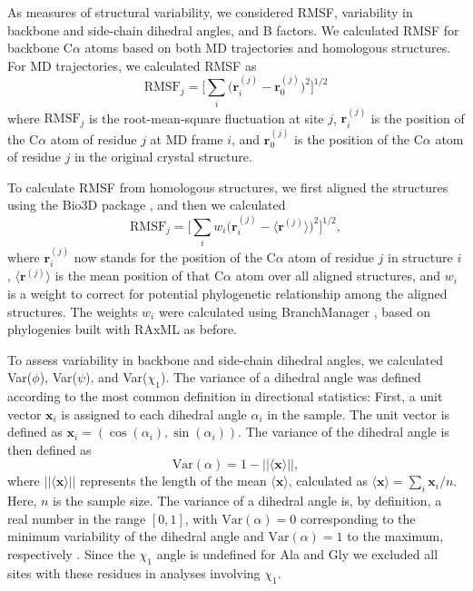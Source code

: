 \documentclass[smallextended]{svjour3}
\begin{document}
As measures of structural variability, we considered RMSF, variability in backbone and side-chain dihedral angles, and B factors. We calculated RMSF for backbone C$\alpha$ atoms based on both MD trajectories and homologous structures. For MD trajectories, we calculated RMSF as
\begin{equation}
    \text{RMSF}_j = \Big[\sum_i \big(\mathbf{r}_i^{(j)}-\mathbf{r}_0^{(j)}\big)^2\Big]^{1/2}
\end{equation}
where $\text{RMSF}_j$ is the root-mean-square fluctuation at site $j$, $\mathbf{r}_i^{(j)}$ is the position of the C$\alpha$ atom of residue $j$ at MD frame $i$, and $\mathbf{r}_0^{(j)}$ is the position of the C$\alpha$ atom of residue $j$ in the original crystal structure.

To calculate RMSF from homologous structures, we first aligned the structures using the Bio3D package \citep{Grantetal2006}, and then we calculated
\begin{equation}
    \text{RMSF}_j = \Big[\sum_i w_i\big(\mathbf{r}_i^{(j)}-\langle\mathbf{r}^{(j)}\rangle\big)^2\Big]^{1/2},
\end{equation}
where $\mathbf{r}_i^{(j)}$ now stands for the position of the C$\alpha$ atom of residue $j$ in structure $i$, $\langle\mathbf{r}^{(j)}\rangle$ is the mean position of that C$\alpha$ atom over all aligned structures, and $w_i$ is a weight to correct for potential phylogenetic relationship among the aligned structures. The weights $w_i$ were calculated using BranchManager \citep{StoneSidow2007}, based on phylogenies built with RAxML as before.

To assess variability in backbone and side-chain dihedral angles, we calculated Var($\phi$), Var($\psi$), and Var($\chi_1$). The variance of a dihedral angle was defined according to the most common definition in directional statistics:  
First, a unit vector $\mathbf{x}_i$ is assigned to each dihedral angle $\alpha_i$ in the sample. The unit vector is defined as $\mathbf{x}_i = ( \cos (\alpha_i), \sin (\alpha_i) )$.
The variance of the dihedral angle is then defined as
\begin{equation}
\text{Var}(\alpha) = 1 - ||\langle \mathbf{x}\rangle||,
\end{equation}
where $||\langle \mathbf{x}\rangle||$ represents the length of the mean $\langle \mathbf{x}\rangle$, calculated as $\langle \mathbf{x}\rangle=\sum_i \mathbf{x}_i/n$. Here, $n$ is the sample size. The variance of a dihedral angle is, by definition, a real number in the range $[0,1]$, with $\text{Var}(\alpha) = 0$ corresponding to the minimum variability of the dihedral angle and $\text{Var}(\alpha) = 1$ to the maximum, respectively \citep{Berens2009}. Since the $\chi_1$ angle is undefined for Ala and Gly we excluded all sites with these residues in analyses involving $\chi_1$.
\end{document}
